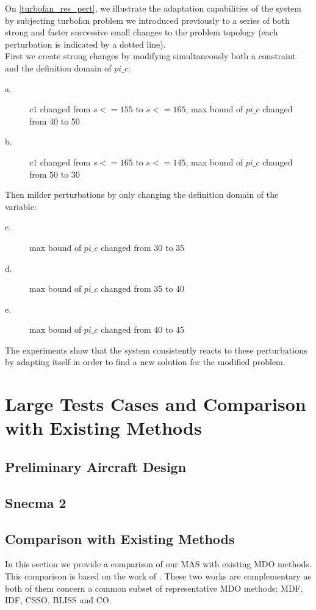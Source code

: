 On \figurename{} \ref{turbofan_res_pert}, we illustrate the adaptation capabilities of the system by subjecting turbofan problem we introduced previously to a series of both strong and faster successive small changes to the problem topology (each perturbation is indicated by a dotted line). \\
First we create strong changes by modifying simultaneously both a constraint and the definition domain of $pi\_c$:
\begin{description}
\item[a.] $c1$ changed from $s <= 155$ to $s <= 165$, max bound of $pi\_c$ changed from 40 to 50
\item[b.] $c1$ changed from $s <= 165$ to $s <= 145$, max bound of $pi\_c$ changed from 50 to 30
\end{description}
 Then milder perturbations by only changing the definition domain of the variable:
\begin{description}
\item[c.] max bound of $pi\_c$ changed from 30 to 35
\item[d.] max bound of $pi\_c$ changed from 35 to 40
\item[e.] max bound of $pi\_c$ changed from 40 to 45
\end{description}
The experiments show that the system consistently reacts to these perturbations by adapting itself in order to find a new solution for the modified problem.

\chapter{Large Tests Cases and Comparison with Existing Methods}

\section{Preliminary Aircraft Design}

\section{Snecma 2}

\section{Comparison with Existing Methods}

In this section we provide a comparison of our MAS with existing MDO methods. This comparison is based on the work of \cite{perez2004evaluation, Yi2008}. These two works are complementary as both of them concern a common subset of representative MDO methods: MDF, IDF, CSSO, BLISS and CO.

